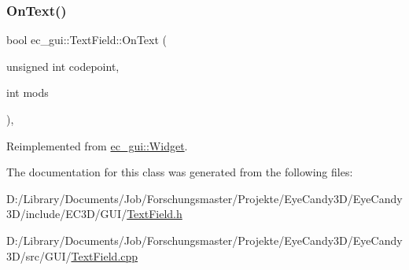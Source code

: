 \subsubsection{\texorpdfstring{On\+Text()}{OnText()}}
{\footnotesize\ttfamily bool ec\+\_\+gui\+::\+Text\+Field\+::\+On\+Text (\begin{DoxyParamCaption}\item[{unsigned int}]{codepoint,  }\item[{int}]{mods }\end{DoxyParamCaption})\hspace{0.3cm}{\ttfamily [override]}, {\ttfamily [virtual]}}



Reimplemented from \mbox{\hyperlink{classec__gui_1_1_widget_a99980fcd7af47e9f9d29c85a404729f6}{ec\+\_\+gui\+::\+Widget}}.



The documentation for this class was generated from the following files\+:\begin{DoxyCompactItemize}
\item 
D\+:/\+Library/\+Documents/\+Job/\+Forschungsmaster/\+Projekte/\+Eye\+Candy3\+D/\+Eye\+Candy3\+D/include/\+E\+C3\+D/\+G\+U\+I/\mbox{\hyperlink{_text_field_8h}{Text\+Field.\+h}}\item 
D\+:/\+Library/\+Documents/\+Job/\+Forschungsmaster/\+Projekte/\+Eye\+Candy3\+D/\+Eye\+Candy3\+D/src/\+G\+U\+I/\mbox{\hyperlink{_text_field_8cpp}{Text\+Field.\+cpp}}\end{DoxyCompactItemize}

